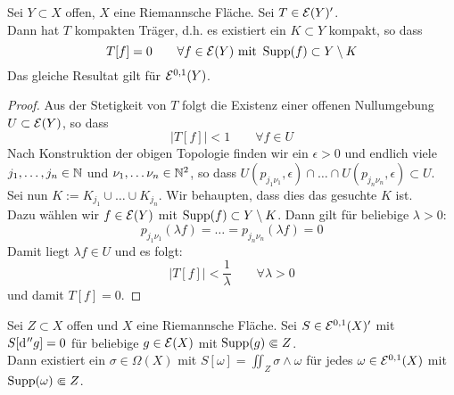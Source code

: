 \begin{lemma}
  \label{lemma:kompakter-träger-funktional}
  Sei $Y \subset X$ offen, $X$ eine Riemannsche Fläche. Sei $T \in
  \mathcal{E}(Y)'$. \\
  Dann hat $T$ kompakten Träger, d.h. es existiert ein $K \subset Y$
  kompakt, so dass
  \[
  T[f] = 0 \qquad \forall f \in \mathcal{E}(Y) \text{ mit } \operatorname{Supp}(f) \subset
  Y \setminus K
  \]
  Das gleiche Resultat gilt für $\mathcal{E}^{0,1}(Y)$.
\end{lemma}

\begin{proof}
  Aus der Stetigkeit von $T$ folgt die Existenz einer offenen
  Nullumgebung $U \subset \mathcal{E}(Y)$, so dass
  \[
  |T[f]| < 1 \qquad \forall f \in U
  \]
  Nach Konstruktion der obigen Topologie finden wir ein $\epsilon > 0$
  und endlich viele $j_1, \dots, j_n \in \mathbb{N}$ und $\nu_1, \dots \nu_n
  \in \mathbb{N}^2$, so dass $U(p_{j_1\nu_1}, \epsilon) \cap \dots \cap
  U(p_{j_n\nu_n}, \epsilon) \subset U$. \\
  Sei nun  $K := K_{j_1} \cup \dots \cup K_{j_n}$. Wir behaupten, dass
  dies das gesuchte $K$ ist. \\
  Dazu wählen wir $f \in \mathcal{E}(Y)$ mit $\operatorname{Supp}(f) \subset Y \setminus
  K$. Dann gilt für beliebige
  $\lambda > 0$:
  \[
  p_{j_1\nu_1}(\lambda f) = \dots = p_{j_n\nu_n}(\lambda f) = 0
  \]
  Damit liegt $\lambda f \in U$ und es folgt:
  \[
  |T[f]| < \frac1\lambda \qquad \forall \lambda >0
  \]
  und damit $T[f] = 0$.
\end{proof}

\begin{lemma}
  \label{lemma:funktional-explizit}
  Sei $Z \subset X$ offen und $X$ eine Riemannsche Fläche. Sei $S \in
  \mathcal{E}^{0,1}(X)'$ mit $S[\d[''g]] = 0$ für beliebige $g \in \mathcal{E}(X)$
  mit $\operatorname{Supp}(g) \Subset Z$. \\
  Dann existiert ein $\sigma \in \Omega(X)$ mit $S[\omega] = \iint_Z
  \sigma \wedge \omega$ für jedes $\omega \in \mathcal{E}^{0,1}(X)$ mit
  $\operatorname{Supp}(\omega) \Subset Z$.
\end{lemma}

